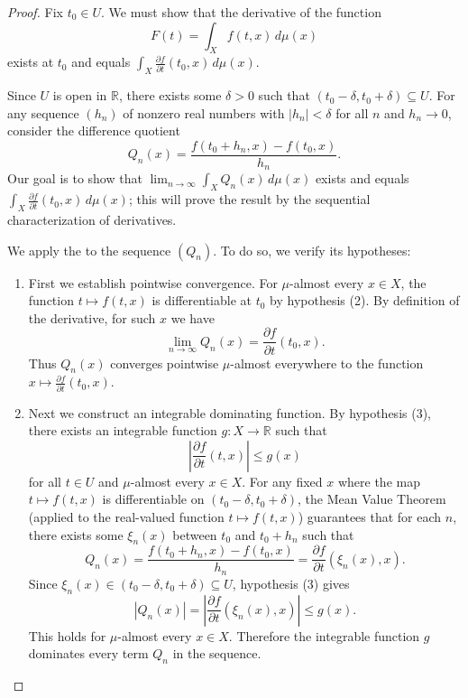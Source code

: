 \begin{proof}
Fix $t_0 \in U$. We must show that the derivative of the function $$F(t) = \int_X f(t,x) \, d\mu(x)$$ exists at $t_0$ and equals $\int_X \frac{\partial f}{\partial t}(t_0, x) \, d\mu(x)$.

Since $U$ is open in $\mathbb{R}$, there exists some $\delta > 0$ such that $(t_0 - \delta, t_0 + \delta) \subseteq U$. For any sequence $(h_n)$ of nonzero real numbers with $|h_n| < \delta$ for all $n$ and $h_n \to 0$, consider the difference quotient $$Q_n(x) = \frac{f(t_0 + h_n, x) - f(t_0, x)}{h_n}.$$ Our goal is to show that $\lim_{n \to \infty} \int_X Q_n(x) \, d\mu(x)$ exists and equals $\int_X \frac{\partial f}{\partial t}(t_0, x) \, d\mu(x)$; this will prove the result by the sequential characterization of derivatives.

We apply the  to the sequence $(Q_n)$. To do so, we verify its hypotheses:

\begin{enumerate}
    \item First we establish pointwise convergence. For $\mu$-almost every $x \in X$, the function $t \mapsto f(t,x)$ is differentiable at $t_0$ by hypothesis (2). By definition of the derivative, for such $x$ we have $$\lim_{n \to \infty} Q_n(x) = \frac{\partial f}{\partial t}(t_0, x).$$ Thus $Q_n(x)$ converges pointwise $\mu$-almost everywhere to the function $x \mapsto \frac{\partial f}{\partial t}(t_0, x)$.

    \item Next we construct an integrable dominating function. By hypothesis (3), there exists an integrable function $g : X \to \mathbb{R}$ such that $$\left|\frac{\partial f}{\partial t}(t,x)\right| \leq g(x)$$ for all $t \in U$ and $\mu$-almost every $x \in X$. For any fixed $x$ where the map $t \mapsto f(t,x)$ is differentiable on $(t_0 - \delta, t_0 + \delta)$, the Mean Value Theorem (applied to the real-valued function $t \mapsto f(t,x)$) guarantees that for each $n$, there exists some $\xi_n(x)$ between $t_0$ and $t_0 + h_n$ such that $$Q_n(x) = \frac{f(t_0 + h_n, x) - f(t_0, x)}{h_n} = \frac{\partial f}{\partial t}(\xi_n(x), x).$$ Since $\xi_n(x) \in (t_0 - \delta, t_0 + \delta) \subseteq U$, hypothesis (3) gives $$|Q_n(x)| = \left|\frac{\partial f}{\partial t}(\xi_n(x), x)\right| \leq g(x).$$ This holds for $\mu$-almost every $x \in X$. Therefore the integrable function $g$ dominates every term $Q_n$ in the sequence.


\end{enumerate}
\end{proof}

